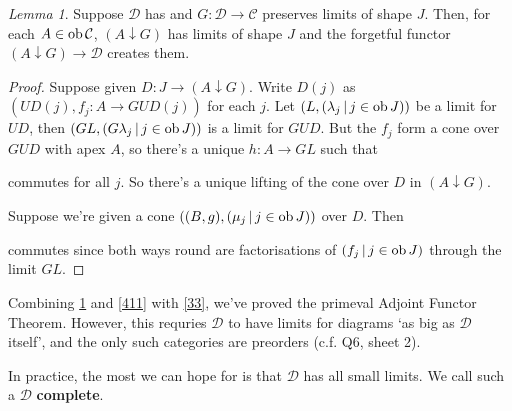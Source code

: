 \documentclass[a4paper]{article}
\theoremstyle{definition}
\theoremstyle{remark}
\theoremstyle{default}
\newtheorem{lemma}[definition]{Lemma}
\numberwithin{definition}{section}
\newcommand*\ob[1]{\textnormal{ob}\,#1}
\begin{document}
\begin{lemma}
	Suppose $\mathcal{D}$ has and $G: \mathcal{D} \to \mathcal{C}$ preserves limits of shape $J$.
	Then, for each $A \in \ob \mathcal{C}$,
	$(A \downarrow G)$ has limits of shape $J$ and the forgetful functor $(A \downarrow G) \to \mathcal{D}$ creates them.
	\label{412}
\end{lemma}
\begin{proof}
	Suppose given $D: J \to (A \downarrow G)$.
	Write $D(j)$ as $(UD(j), f_j: A \to GUD(j))$ for each $j$.
	Let $(L, (\lambda_j \,|\, j \in \ob J))$ be a limit for $UD$,
	then $(GL, (G\lambda_j \,|\, j \in \ob J))$ is a limit for $GUD$.
	But the $f_j$ form a cone over $GUD$ with apex $A$,
	so there's a unique $h: A \to GL$ such that
	\begin{center}
	\end{center}
	commutes for all $j$.
	So there's a unique lifting of the cone over $D$ in $(A \downarrow G)$.
	
	Suppose we're given a cone $((B, g), (\mu_j \,|\, j \in \ob J))$ over $D$.
	Then
	\begin{center}
	\end{center}
	commutes since both ways round are factorisations of $(f_j \,|\, j \in \ob J)$ through the limit $GL$.
\end{proof}

Combining \ref{412} and \ref{411} with \ref{33},
we've proved the primeval Adjoint Functor Theorem.
However, this requries $\mathcal{D}$ to have limits for diagrams `as big as $\mathcal{D}$ itself',
and the only such categories are preorders (c.f. Q6, sheet 2).

In practice, the most we can hope for is that $\mathcal{D}$ has all small limits.
We call such a $\mathcal{D}$ \textbf{complete}.
\end{document}
